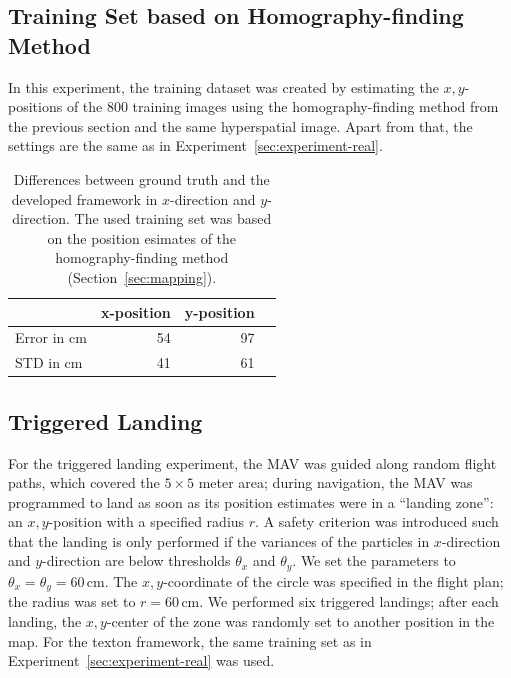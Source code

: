 \documentclass[11pt]{report}
\begin{document}
\subsection{Training Set based on Homography-finding Method}
\label{sec:traininghomo}

In this experiment, the training dataset was created by estimating the
$x,y$-positions of the 800 training images using the
homography-finding method from the previous section and the same
hyperspatial image. Apart from that, the settings are the same as in
Experiment~\ref{sec:experiment-real}.


\begin{table}[H]
  \centering
  \begin{tabular}{lrrr}
    \toprule
    & x-position & y-position\\
    \midrule
    Error in cm & 54 & 97\\
    STD in cm & 41 & 61\\
    \bottomrule
  \end{tabular}
  \caption[Estimates of the texton-based approach]{Differences between
    ground truth and the developed framework in $x$-direction and
    $y$-direction. The used training set was based on the position
    esimates of the homography-finding method (Section~\ref{sec:mapping}).}
  \label{tab:routehomo}
\end{table}


\subsection{Triggered Landing}
\label{sec:triggered}

For the triggered landing experiment, the MAV was guided along random
flight paths, which covered the $5 \times 5$ meter area; during
navigation, the MAV was programmed to land as soon as its position
estimates were in a ``landing zone'': an $x,y$-position with a
specified radius $r$. A safety criterion was introduced such that the
landing is only performed if the variances of the particles in
$x$-direction and $y$-direction are below thresholds $\theta_x$ and
$\theta_y$. We set the parameters to $\theta_x = \theta_y = 60$\,cm.
The $x,y$-coordinate of the circle was specified in the flight plan;
the radius was set to $r = 60$\,cm. We performed six triggered
landings; after each landing, the $x,y$-center of the zone was
randomly set to another position in the map. For the texton framework,
the same training set as in Experiment~\ref{sec:experiment-real} was
used.
\end{document}
